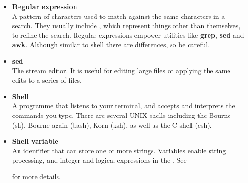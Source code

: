 \begin{itemize}
\item {\bf\label{sc4_gl_reg_exp}Regular expression}\\
      A pattern of characters used to match against the same
      characters in a search.  They usually include , which represent things other than
      themselves, to refine the search.  Regular expressions empower
      utilities like {\bf grep}, {\bf sed} and {\bf awk}.  Although
      similar to shell  there are
      differences, so be careful.


\item {\bf\label{sc4_gl_sed}sed}\\
      The stream editor.  It is useful for editing large files or
      applying the same edits to a series of files.

\item {\bf\label{sc4_gl_she}Shell}\\
      A programme that listens to your terminal, and accepts and
      interprets the commands you type.  There are several UNIX
      shells including the Bourne (sh), Bourne-again (bash),
      Korn (ksh), as well as the C shell (csh).

\item {\bf\label{sc4_gl_she_var}Shell variable}\\
      An identifier that can store one or more strings.  Variables
      enable string processing, and integer and logical expressions
      in the .  See
\begin{htmlonly}
\end{htmlonly}
       for more details.


\end{itemize}
